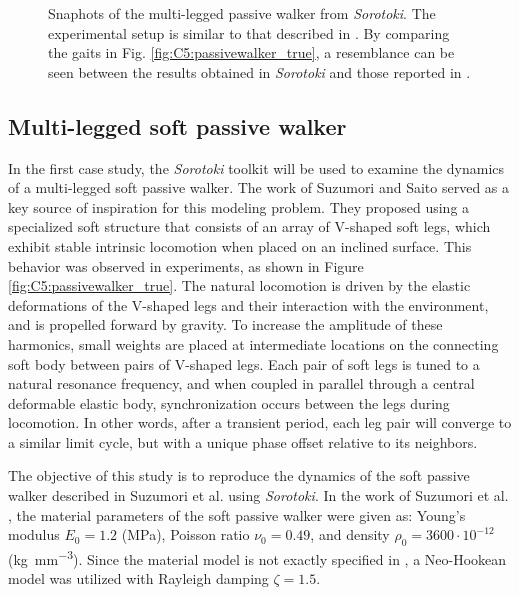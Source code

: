{\begin{figure}[t]
%
\caption{Snaphots of the multi-legged passive walker from \textit{Sorotoki}. The experimental setup is similar to that described in \cite{Suzumori2008Sep}. By comparing the gaits in Fig. \ref{fig:C5:passivewalker_true}, a resemblance can be seen between the results obtained in \textit{Sorotoki} and those reported in \cite{Suzumori2008Sep}. }
\label{fig:C5:passivewalker_soro}
\end{figure}
\clearpage
}
%
\subsection{Multi-legged soft passive walker}
\label{sec:C5:suzumori_walker}
In the first case study, the \textit{Sorotoki} toolkit will be used to examine the dynamics of a multi-legged soft passive walker. The work of Suzumori and Saito \cite{Suzumori2008Sep} served as a key source of inspiration for this modeling problem. They proposed using a specialized soft structure that consists of an array of V-shaped soft legs, which exhibit stable intrinsic locomotion when placed on an inclined surface. This behavior was observed in experiments, as shown in Figure \ref{fig:C5:passivewalker_true}. The natural locomotion is driven by the elastic deformations of the V-shaped legs and their interaction with the environment, and is propelled forward by gravity. To increase the amplitude of these harmonics, small weights are placed at intermediate locations on the connecting soft body between pairs of V-shaped legs. Each pair of soft legs is tuned to a natural resonance frequency, and when coupled in parallel through a central deformable elastic body, synchronization occurs between the legs during locomotion. In other words, after a transient period, each leg pair will converge to a similar limit cycle, but with a unique phase offset relative to its neighbors.

The objective of this study is to reproduce the dynamics of the soft passive walker described in Suzumori et al. \cite{Suzumori2008Sep} using \textit{Sorotoki}. In the work of Suzumori et al. \cite{Suzumori2008Sep}, the material parameters of the soft passive walker were given as: Young's modulus $E_0 = 1.2$ (\si{\mega \pascal}), Poisson ratio $\nu_0 = 0.49$, and density $\rho_0 = 3600 \cdot 10^{-12}$ (\si{\kilo \gram \per \milli \metre \cubed}). Since the material model is not exactly specified in \cite{Suzumori2008Sep}, a Neo-Hookean model was utilized with Rayleigh damping $\zeta = 1.5$.

